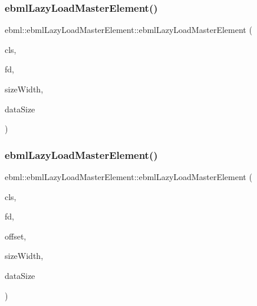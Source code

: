 \subsubsection{\texorpdfstring{ebml\+Lazy\+Load\+Master\+Element()}{ebmlLazyLoadMasterElement()}\hspace{0.1cm}{\footnotesize\ttfamily [3/4]}}
{\footnotesize\ttfamily ebml\+::ebml\+Lazy\+Load\+Master\+Element\+::ebml\+Lazy\+Load\+Master\+Element (\begin{DoxyParamCaption}\item[{const ebml\+Lazy\+Load\+Master\+Element\+Class $\ast$}]{cls,  }\item[{F\+I\+LE $\ast$}]{fd,  }\item[{unsigned char}]{size\+Width,  }\item[{size\+\_\+t}]{data\+Size }\end{DoxyParamCaption})\hspace{0.3cm}{\ttfamily [protected]}}

\mbox{\label{classebml_1_1ebmlLazyLoadMasterElement_a75139874462a9f5888a06a10b0b1d7fa}} 
\subsubsection{\texorpdfstring{ebml\+Lazy\+Load\+Master\+Element()}{ebmlLazyLoadMasterElement()}\hspace{0.1cm}{\footnotesize\ttfamily [4/4]}}
{\footnotesize\ttfamily ebml\+::ebml\+Lazy\+Load\+Master\+Element\+::ebml\+Lazy\+Load\+Master\+Element (\begin{DoxyParamCaption}\item[{const ebml\+Lazy\+Load\+Master\+Element\+Class $\ast$}]{cls,  }\item[{int}]{fd,  }\item[{off\+\_\+t}]{offset,  }\item[{unsigned char}]{size\+Width,  }\item[{size\+\_\+t}]{data\+Size }\end{DoxyParamCaption})\hspace{0.3cm}{\ttfamily [protected]}}



